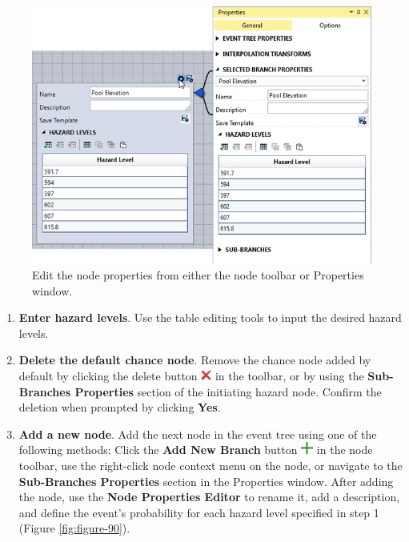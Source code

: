 \documentclass[
]{book}
\begin{document}
\begin{figure}

{\centering \includegraphics{images/figure89} 

}

\caption{Edit the node properties from either the node toolbar or Properties window.}\label{fig:figure-89}
\end{figure}

\begin{enumerate}
\def\labelenumi{\arabic{enumi}.}
\setcounter{enumi}{1}
\item
  \textbf{Enter hazard levels}. Use the table editing tools to input the desired hazard levels.
\item
  \textbf{Delete the default chance node}. Remove the chance node added by default by clicking the delete button \includegraphics{images/deletebranch.png} in the toolbar, or by using the \textbf{Sub-Branches Properties} section of the initiating hazard node. Confirm the deletion when prompted by clicking \textbf{Yes}.
\item
  \textbf{Add a new node}. Add the next node in the event tree using one of the following methods: Click the \textbf{Add New Branch} button \includegraphics{images/newbranch.png} in the node toolbar, use the right-click node context menu on the node, or navigate to the \textbf{Sub-Branches Properties} section in the Properties window. After adding the node, use the \textbf{Node Properties Editor} to rename it, add a description, and define the event's probability for each hazard level specified in step 1 (Figure \ref{fig:figure-90}).
\end{enumerate}
\end{document}
